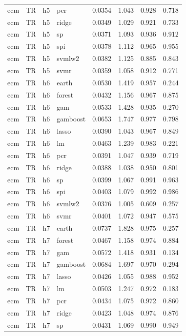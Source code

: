 \begin{ThreePartTable}
\begin{longtable}[t]{llclcccc}
ecm & TR & h5 & pcr & 0.0354 & 1.043 & 0.928 & 0.718\\
ecm & TR & h5 & ridge & 0.0349 & 1.029 & 0.921 & 0.733\\
ecm & TR & h5 & sp & 0.0371 & 1.093 & 0.936 & 0.912\\
ecm & TR & h5 & spi & 0.0378 & 1.112 & 0.965 & 0.955\\
ecm & TR & h5 & svmlw2 & 0.0382 & 1.125 & 0.885 & 0.843\\
ecm & TR & h5 & svmr & 0.0359 & 1.058 & 0.912 & 0.771\\
\addlinespace
ecm & TR & h6 & earth & 0.0530 & 1.419 & 0.957 & 0.244\\
ecm & TR & h6 & forest & 0.0432 & 1.156 & 0.967 & 0.875\\
ecm & TR & h6 & gam & 0.0533 & 1.428 & 0.935 & 0.270\\
ecm & TR & h6 & gamboost & 0.0653 & 1.747 & 0.977 & 0.798\\
ecm & TR & h6 & lasso & 0.0390 & 1.043 & 0.967 & 0.849\\
ecm & TR & h6 & lm & 0.0463 & 1.239 & 0.983 & 0.221\\
ecm & TR & h6 & pcr & 0.0391 & 1.047 & 0.939 & 0.719\\
ecm & TR & h6 & ridge & 0.0388 & 1.038 & 0.950 & 0.801\\
ecm & TR & h6 & sp & 0.0399 & 1.067 & 0.991 & 0.963\\
ecm & TR & h6 & spi & 0.0403 & 1.079 & 0.992 & 0.986\\
ecm & TR & h6 & svmlw2 & 0.0376 & 1.005 & 0.609 & 0.257\\
ecm & TR & h6 & svmr & 0.0401 & 1.072 & 0.947 & 0.575\\
\addlinespace
ecm & TR & h7 & earth & 0.0737 & 1.828 & 0.975 & 0.257\\
ecm & TR & h7 & forest & 0.0467 & 1.158 & 0.974 & 0.884\\
ecm & TR & h7 & gam & 0.0572 & 1.418 & 0.931 & 0.134\\
ecm & TR & h7 & gamboost & 0.0684 & 1.697 & 0.970 & 0.294\\
ecm & TR & h7 & lasso & 0.0426 & 1.055 & 0.988 & 0.952\\
ecm & TR & h7 & lm & 0.0503 & 1.247 & 0.972 & 0.183\\
ecm & TR & h7 & pcr & 0.0434 & 1.075 & 0.972 & 0.860\\
ecm & TR & h7 & ridge & 0.0423 & 1.048 & 0.974 & 0.876\\
ecm & TR & h7 & sp & 0.0431 & 1.069 & 0.990 & 0.949\\

\end{longtable}
\end{ThreePartTable}
